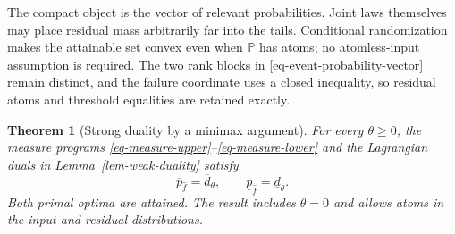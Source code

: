 \documentclass[review,11pt,3p,authoryear,nopreprintline]{elsarticle}
\newtheorem{theorem}{Theorem}
\begin{document}
The compact object is the vector of relevant probabilities. Joint laws themselves may place residual mass arbitrarily far into the tails. Conditional randomization makes the attainable set convex even when $\mathbb P$ has atoms; no atomless-input assumption is required. The two rank blocks in \eqref{eq-event-probability-vector} remain distinct, and the failure coordinate uses a closed inequality, so residual atoms and threshold equalities are retained exactly.

\begin{theorem}[Strong duality by a minimax argument]
  \label{thm-strong-duality}
  For every $\theta\ge0$, the measure programs \eqref{eq-measure-upper}--\eqref{eq-measure-lower} and the Lagrangian duals in Lemma~\ref{lem-weak-duality} satisfy
  \begin{equation}
    \overline p_{\hat f}=\overline d_\theta,
    \qquad
    \underline p_{\hat f}=\underline d_\theta.
    \label{eq-strong-duality}
  \end{equation}
  Both primal optima are attained. The result includes $\theta=0$ and allows atoms in the input and residual distributions.
\end{theorem}
\end{document}

